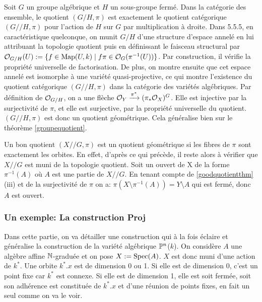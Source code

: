 \begin{ex}
Soit $G$ un groupe algébrique et $H$ un sous-groupe fermé. Dans la catégorie des ensemble, le quotient $(G/H,\pi)$ est exactement le quotient catégorique $(G//H,\pi)$ pour l'action de $H$ sur $G$ par multiplication à droite. Dans \cite{LAGSpringer} 5.5.5, en caractéristique quelconque, on munit $G/H$ d'une structure d'espace annelé en lui attribuant la topologie quotient puis en définissant le faisceau structural par $\mathcal{O}_{G/H}(U):=\lbrace f\in\textrm{Map}(U,k)\mid f\pi \in \mathcal{O}_G(\pi^{-1}(U))\rbrace$. Par construction, il vérifie la propriété universelle de factorisation. De plus, on montre ensuite que cet espace annelé est isomorphe à une variété quasi-projective, ce qui montre l'existence du quotient catégorique $(G//H,\pi)$ dans la catégorie des variétés algébriques. Par définition de $\mathcal{O}_{G/H}$, on a une flèche $\mathcal{O}_Y \xrightarrow{\pi^*} (\pi_*\mathcal{O}_X)^G$. Elle est injective par la surjectivité de $\pi$, et elle est surjective, par la propriété universelle du quotient. $(G//H,\pi)$ est donc un quotient géométrique. Cela généralise bien sur le théorème \ref{groupequotient}.
\end{ex}

\begin{ex}
Un bon quotient $(X//G, \pi)$ est un quotient géométrique si les fibres de $\pi$ sont exactement les orbites. En effet, d'après ce qui précède, il reste alors à vérifier que $X//G$ est muni de la topologie quotient. Soit un ouvert de X de la forme $\pi^{-1}(A)$ où $A$ est une partie de $X//G$. En tenant compte de \ref{goodquotientthm} (iii) et de la surjectivité de $\pi$ on a: $\pi(X\setminus \pi^{-1}(A))=Y\setminus A$ qui est fermé, donc $A$ est ouvert.
\end{ex}

\subsubsection{Un exemple: La construction Proj}
Dans cette partie, on va détailler une construction qui à la fois éclaire et généralise la construction de la variété algébrique $\mathbb{P}^n$($k$). On considère $A$ une algèbre affine $\mathbb{N}$-graduée et on pose $X:=\operatorname{Spec}(A)$. $X$ est donc muni d'une action de $k^*$. Une orbite $k^*.x$ est de dimension 0 ou 1. Si elle est de dimension 0, c'est un point fixe car $k^*$ est connexe. Si elle est de dimension 1, elle est soit fermée, soit son adhérence est constituée de $k^*.x$  et d'une réunion de points fixes, en fait un seul comme on va le voir.

